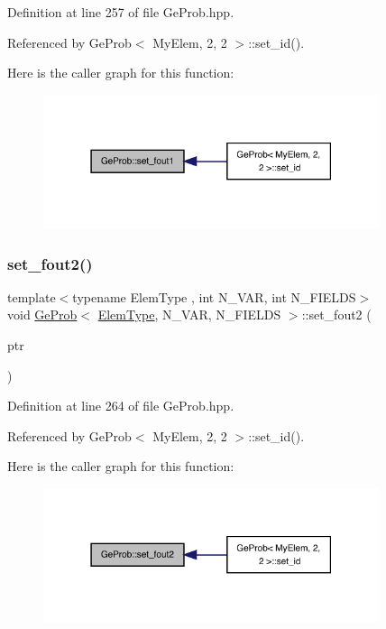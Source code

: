 Definition at line 257 of file Ge\+Prob.\+hpp.



Referenced by Ge\+Prob$<$ My\+Elem, 2, 2 $>$\+::set\+\_\+id().

Here is the caller graph for this function\+:
\nopagebreak
\begin{figure}[H]
\begin{center}
\leavevmode
\includegraphics[width=279pt]{classGeProb_a75433e7f3aec6d8f0746cd3e0e82db96_icgraph}
\end{center}
\end{figure}
\mbox{\label{classGeProb_a18762ac0ce4ba659b15e97a5521bc456}} 
\subsubsection{\texorpdfstring{set\+\_\+fout2()}{set\_fout2()}}
{\footnotesize\ttfamily template$<$typename Elem\+Type , int N\+\_\+\+V\+AR, int N\+\_\+\+F\+I\+E\+L\+DS$>$ \\
void \hyperlink{classGeProb}{Ge\+Prob}$<$ \hyperlink{spectral_8h_aaa2c1a7b2d1b12c590d730fe6ac839fa}{Elem\+Type}, N\+\_\+\+V\+AR, N\+\_\+\+F\+I\+E\+L\+DS $>$\+::set\+\_\+fout2 (\begin{DoxyParamCaption}\item[{F\+I\+LE $\ast$}]{ptr }\end{DoxyParamCaption})}



Definition at line 264 of file Ge\+Prob.\+hpp.



Referenced by Ge\+Prob$<$ My\+Elem, 2, 2 $>$\+::set\+\_\+id().

Here is the caller graph for this function\+:
\nopagebreak
\begin{figure}[H]
\begin{center}
\leavevmode
\includegraphics[width=279pt]{classGeProb_a18762ac0ce4ba659b15e97a5521bc456_icgraph}
\end{center}
\end{figure}
\mbox{\label{classGeProb_a2fa255c26250f6ee540b910949f530ed}} 
